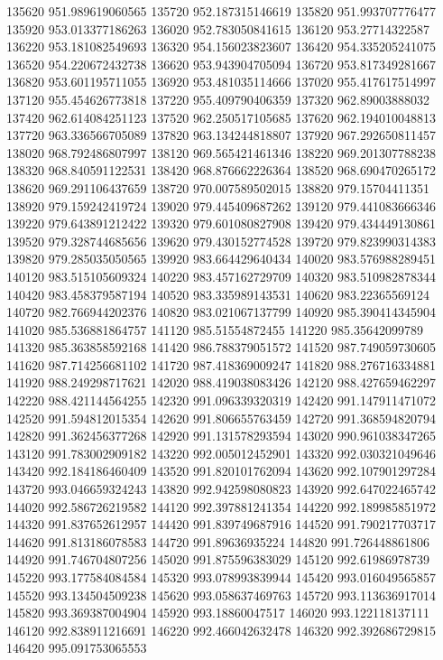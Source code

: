 {135620 951.989619060565
135720 952.187315146619
135820 951.993707776477
135920 953.013377186263
136020 952.783050841615
136120 953.27714322587
136220 953.181082549693
136320 954.156023823607
136420 954.335205241075
136520 954.220672432738
136620 953.943904705094
136720 953.817349281667
136820 953.601195711055
136920 953.481035114666
137020 955.417617514997
137120 955.454626773818
137220 955.409790406359
137320 962.89003888032
137420 962.614084251123
137520 962.250517105685
137620 962.194010048813
137720 963.336566705089
137820 963.134244818807
137920 967.292650811457
138020 968.792486807997
138120 969.565421461346
138220 969.201307788238
138320 968.840591122531
138420 968.876662226364
138520 968.690470265172
138620 969.291106437659
138720 970.007589502015
138820 979.15704411351
138920 979.159242419724
139020 979.445409687262
139120 979.441083666346
139220 979.643891212422
139320 979.601080827908
139420 979.434449130861
139520 979.328744685656
139620 979.430152774528
139720 979.823990314383
139820 979.285035050565
139920 983.664429640434
140020 983.576988289451
140120 983.515105609324
140220 983.457162729709
140320 983.510982878344
140420 983.458379587194
140520 983.335989143531
140620 983.22365569124
140720 982.766944202376
140820 983.021067137799
140920 985.390414345904
141020 985.536881864757
141120 985.51554872455
141220 985.35642099789
141320 985.363858592168
141420 986.788379051572
141520 987.749059730605
141620 987.714256681102
141720 987.418369009247
141820 988.276716334881
141920 988.249298717621
142020 988.419038083426
142120 988.427659462297
142220 988.421144564255
142320 991.096339320319
142420 991.147911471072
142520 991.594812015354
142620 991.806655763459
142720 991.368594820794
142820 991.362456377268
142920 991.131578293594
143020 990.961038347265
143120 991.783002909182
143220 992.005012452901
143320 992.030321049646
143420 992.184186460409
143520 991.820101762094
143620 992.107901297284
143720 993.046659324243
143820 992.942598080823
143920 992.647022465742
144020 992.586726219582
144120 992.397881241354
144220 992.189985851972
144320 991.837652612957
144420 991.839749687916
144520 991.790217703717
144620 991.813186078583
144720 991.89636935224
144820 991.726448861806
144920 991.746704807256
145020 991.875596383029
145120 992.61986978739
145220 993.177584084584
145320 993.078993839944
145420 993.016049565857
145520 993.134504509238
145620 993.058637469763
145720 993.113636917014
145820 993.369387004904
145920 993.18860047517
146020 993.122118137111
146120 992.838911216691
146220 992.466042632478
146320 992.392686729815
146420 995.091753065553
}
